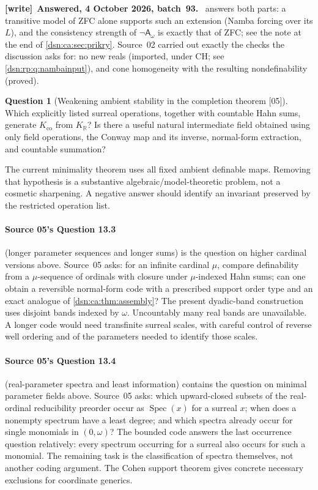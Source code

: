 \documentclass[11pt,a4paper]{article}
\numberwithin{equation}{section}
\theoremstyle{definition}
\newtheorem{question}[question]{Question}
\theoremstyle{remark}
\newcommand{\R}{\mathbb R}
\newcommand{\src}[1]{\textup{\textsf{\small[#1]}}}
\newenvironment{writenote}[1][]{\par\medskip\begingroup\small\noindent\textbf{[write]}\if\relax\detokenize{#1}\relax\else~\textbf{#1.}\fi~\ignorespaces}{\par\endgroup\medskip}
\newcommand{\KR}{K_{\R}}
\newcommand{\Kco}{K_{\mathrm{co}}}
\newcommand{\Asm}{\mathsf A_{\omega}}
\newcommand{\Spec}{\operatorname{Spec}}
\begin{document}
\begin{writenote}[Answered, 4 October 2026, batch~93]
 answers both parts: a transitive model of ZFC alone
supports such an extension (Namba forcing over its $L$), and the consistency
strength of $\neg\Asm$ is exactly that of ZFC; see the note at the end of
\cref{dsn:ca:sec:prikry}. Source~02 carried out exactly the checks the
discussion asks for: no new reals (imported, under CH; see
\cref{dsn:rp:q:nambainput}), and cone homogeneity with the resulting
nondefinability (proved).
\end{writenote}

\begin{question}[Weakening ambient stability in the completion theorem \src{05}]
Which explicitly listed surreal operations, together with countable
Hahn sums, generate $\Kco$ from $\KR$? Is there a useful natural
intermediate field obtained using only field operations, the Conway
map and its inverse, normal-form extraction, and countable summation?
\end{question}
The current minimality theorem uses all fixed ambient definable maps.
Removing that hypothesis is a substantive algebraic/model-theoretic
problem, not a cosmetic sharpening. A negative answer should identify
an invariant preserved by the restricted operation list.


\paragraph{Source 05's Question 13.3} (longer parameter sequences and longer
sums) is the question on higher cardinal versions above. Source~05 asks: for
an infinite cardinal $\mu$, compare definability from a $\mu$-sequence of
ordinals with closure under $\mu$-indexed Hahn sums; can one obtain a
reversible normal-form code with a prescribed support order type and an exact
analogue of \cref{dsn:ca:thm:assembly}?
The present dyadic-band construction uses disjoint bands indexed by
$\omega$. Uncountably many real bands are unavailable. A longer code
would need transfinite surreal scales, with careful control of reverse
well ordering and of the parameters needed to identify those scales.

\paragraph{Source 05's Question 13.4} (real-parameter spectra and least
information) contains the question on minimal parameter fields above. Source~05
asks: which upward-closed subsets of the real-ordinal reducibility preorder
occur as $\Spec(x)$ for a surreal $x$; when does a nonempty spectrum have a
least degree; and which spectra already occur for single monomials in
$(0,\omega)$?
The bounded code answers the last occurrence question relatively:
every spectrum occurring for a surreal also occurs for such a monomial.
The remaining task is the classification of spectra themselves,
not another coding argument. The Cohen support theorem gives concrete
necessary exclusions for coordinate generics.
\end{document}
